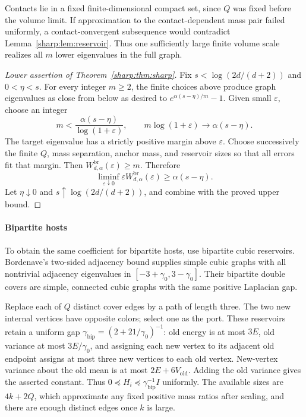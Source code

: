 Contacts lie in a fixed finite-dimensional compact set, since $Q$ was
fixed before the volume limit. If approximation to the contact-dependent
mass pair failed uniformly, a contact-convergent subsequence would
contradict Lemma~\ref{sharp:lem:reservoir}. Thus one sufficiently large finite
volume scale realizes all $m$ lower eigenvalues in the full graph.

\begin{proof}[Lower assertion of Theorem~\ref{sharp:thm:sharp}]
Fix $s<\log(2d/(d+2))$ and $0<\eta<s$. For every integer $m\ge2$, the finite
choices above produce graph eigenvalues as close from below as desired
to $e^{\alpha(s-\eta)/m}-1$. Given small $\varepsilon$, choose an integer
\[
 m<\frac{\alpha(s-\eta)}{\log(1+\varepsilon)},\qquad
 m\log(1+\varepsilon)\longrightarrow\alpha(s-\eta).
\]
The target eigenvalue has a strictly positive margin above
$\varepsilon$. Choose successively the finite $Q$, mass separation,
anchor mass, and reservoir sizes so that all errors fit that margin.
Then $W^{\mathrm{br}}_{d,\alpha}(\varepsilon)\ge m$. Therefore
\[
 \liminf_{\varepsilon\downarrow0}\varepsilon
            W^{\mathrm{br}}_{d,\alpha}(\varepsilon)
                         \ge\alpha(s-\eta).
\]
Let $\eta\downarrow0$ and $s\uparrow\log(2d/(d+2))$, and combine with the
proved upper bound.
\end{proof}

\paragraph{Bipartite hosts}
To obtain the same coefficient for bipartite hosts, use bipartite
cubic reservoirs. Bordenave's two-sided adjacency bound supplies
simple cubic graphs with all nontrivial adjacency eigenvalues in
$[-3+\gamma_0,3-\gamma_0]$. Their bipartite double covers are simple,
connected cubic graphs with the same positive Laplacian gap.

Replace each of $Q$ distinct cover edges by a path of length three.
The two new internal vertices have opposite colors; select one as the
port. These reservoirs retain a uniform gap
$\gamma_{\mathrm{bip}}=(2+21/\gamma_0)^{-1}$: old energy is at most
$3E$, old variance at most $3E/\gamma_0$, and assigning each new
vertex to its adjacent old endpoint assigns at most three new vertices
to each old vertex. New-vertex variance about the old mean is at most
$2E+6V_{\mathrm{old}}$. Adding the old variance gives the asserted
constant. Thus $0\preceq H_i\preceq\gamma_{\mathrm{bip}}^{-1}I$
uniformly. The available sizes are $4k+2Q$, which approximate any
fixed positive mass ratios after scaling, and there are enough distinct
edges once $k$ is large.

